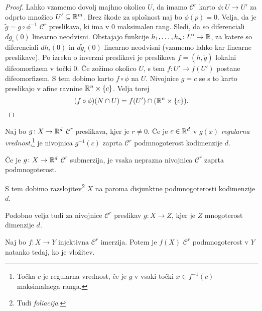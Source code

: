 \begin{proof}
Lahko vzamemo dovolj majhno okolico $U$, da imamo $\mathcal{C}^r$
karto $\phi \colon U \to U'$ za odprto množico $U' \subseteq \mathbb{R}^m$.
Brez škode za splošnost naj bo $\phi(p) = 0$. Velja, da je
$\widetilde{g} = g \circ \phi^{-1}$ $\mathcal{C}^r$ preslikava, ki
ima v $0$ maksimalen rang. Sledi, da so diferenciali
$d \widetilde{g}_i(0)$ linearno neodvisni. Obstajajo funkcije
$h_1, \dots, h_n \colon U' \to \mathbb{R}$, za katere so diferenciali
$dh_i(0)$ in $d \widetilde{g}_i(0)$ linearno neodvisni (vzamemo
lahko kar linearne preslikave). Po izreku o inverzni preslikavi je
preslikava $f = (h, \widetilde{g})$ lokalni difeomorfizem v točki
$0$. Če zožimo okolico $U$, s tem $f \colon U' \to f(U')$ postane
difeomorfizem. S tem dobimo karto $f \circ \phi$ na $U$. Nivojnice
$g = c$ se s to karto preslikajo v afine ravnine
$\mathbb{R}^n \times \left\{c\right\}$. Velja torej
\[
(f \circ \phi)(N \cap U) = f(U') \cap (\mathbb{R}^n \times \left\{c\right\}).
\qedhere
\]
\end{proof}

\begin{posledica}
Naj bo $g \colon X \to \mathbb{R}^d$ $\mathcal{C}^r$ preslikava, kjer je
$r \ne 0$. Če je $c \in \mathbb{R}^d$ v $g(x)$
\emph{regularna vrednost},\footnote{Točka $c$ je regularna
vrednost, če je $g$ v vsaki točki $x \in f^{-1}(c)$ maksimalnega
ranga.} je nivojnica $g^{-1}(c)$ zaprta $\mathcal{C}^r$
podmnogoterost kodimenzije $d$.
\end{posledica}

\begin{posledica}
Če je $g \colon X \to \mathbb{R}^d$ $\mathcal{C}^r$ submerzija, je vsaka
neprazna nivojnica $\mathcal{C}^r$ zaprta podmnogoterost.
\end{posledica}

\begin{opomba}
S tem dobimo razslojitev\footnote{Tudi \emph{foliacija}.} $X$ na
paroma disjunktne podmnogoterosti kodimenzije $d$.
\end{opomba}

\begin{opomba}
Podobno velja tudi za nivojnice $\mathcal{C}^r$ preslikav
$g \colon X \to Z$, kjer je $Z$ mnogoterost dimenzije $d$.
\end{opomba}


\begin{izrek}
Naj bo $f \colon X \to Y$ injektivna $\mathcal{C}^r$ imerzija.
Potem je $f(X)$ $\mathcal{C}^r$ podmnogoterost v $Y$ natanko tedaj,
ko je vložitev.
\end{izrek}

